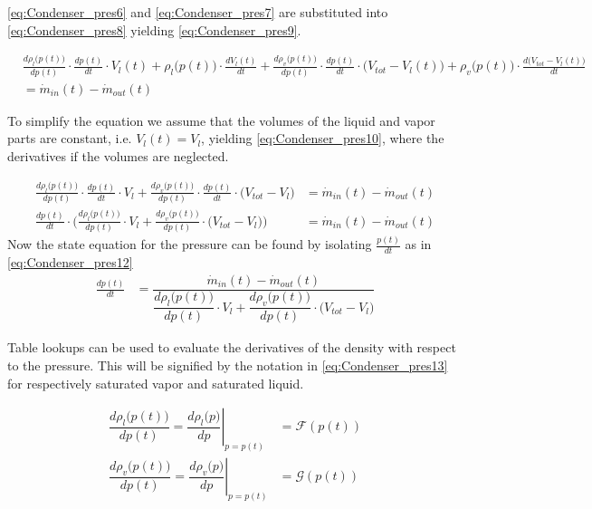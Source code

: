 \cref{eq:Condenser_pres6} and \cref{eq:Condenser_pres7} are substituted into \cref{eq:Condenser_pres8} yielding \cref{eq:Condenser_pres9}.

\begin{equation}\label{eq:Condenser_pres9}
	\begin{split}
		& \frac{d \rho_{l}\bigl(p(t)\bigr)}{dp(t)} \cdot \frac{dp(t)}{dt} \cdot V_l(t)   +   \rho_{l}\bigl(p(t)\bigr)\cdot\frac{d V_l(t)}{dt} +  \frac{d \rho_{v}\bigl(p(t)\bigr)}{dp(t)} \cdot \frac{dp(t)}{dt} \cdot \bigl(V_{tot} - V_l(t)\bigr)   +
		\rho_{v}\bigl(p(t)\bigr)\cdot\frac{d \bigl(V_{tot} - V_l(t)\bigr)}{dt}  \\ &= \dot{m}_{in}(t) - \dot{m}_{out}(t)
	\end{split}
\end{equation}

To simplify the equation we assume that the volumes of the liquid and vapor parts are constant, i.e. $ V_l(t) = V_l$, yielding \cref{eq:Condenser_pres10}, where the derivatives if the volumes are neglected.

\begin{align}
		\frac{d \rho_{l}\bigl(p(t)\bigr)}{dp(t)} \cdot \frac{dp(t)}{dt} \cdot V_l +  \frac{d \rho_{v}\bigl(p(t)\bigr)}{dp(t)} \cdot \frac{dp(t)}{dt} \cdot \bigl(V_{tot} - V_l\bigr) & = \dot{m}_{in}(t) - \dot{m}_{out}(t) \label{eq:Condenser_pres10} \\
		 \frac{dp(t)}{dt} \cdot \Biggl( \frac{d \rho_{l}\bigl(p(t)\bigr)}{dp(t)} \cdot V_l +  \frac{d \rho_{v}\bigl(p(t)\bigr)}{dp(t)} \cdot \bigl(V_{tot} - V_l\bigr) \Biggr) & = \dot{m}_{in}(t) - \dot{m}_{out}(t) \label{eq:Condenser_pres11}
\end{align}
Now the state equation for the pressure can be found by isolating $ \frac{p(t)}{dt} $ as in \cref{eq:Condenser_pres12}
\begin{align}
	\frac{dp(t)}{dt} & = \dfrac{\dot{m}_{in}(t) - \dot{m}_{out}(t)}{ \dfrac{d \rho_{l}\bigl(p(t)\bigr)}{dp(t)} \cdot V_l +  \dfrac{d \rho_{v}\bigl(p(t)\bigr)}{dp(t)} \cdot \bigl(V_{tot} - V_l\bigr) } \label{eq:Condenser_pres12}
\end{align}

Table lookups can be used to evaluate the derivatives of the density with respect to the pressure. This will be signified by the notation in \cref{eq:Condenser_pres13} for respectively saturated vapor and saturated liquid.

\begin{align}
		\dfrac{d \rho_l\bigl(p(t)\bigr)}{dp(t)} = \left. \dfrac{d \rho_l\bigl(p\bigr)}{dp} \right |_{p = p(t)} & = \mathcal{F}(p(t)) \label{eq:Condenser_pres13} \\
		\dfrac{d \rho_v\bigl(p(t)\bigr)}{dp(t)} = \left. \dfrac{d \rho_v\bigl(p\bigr)}{dp} \right |_{p = p(t)} & = \mathcal{G}(p(t)) \label{eq:Condenser_pres14}
\end{align}

